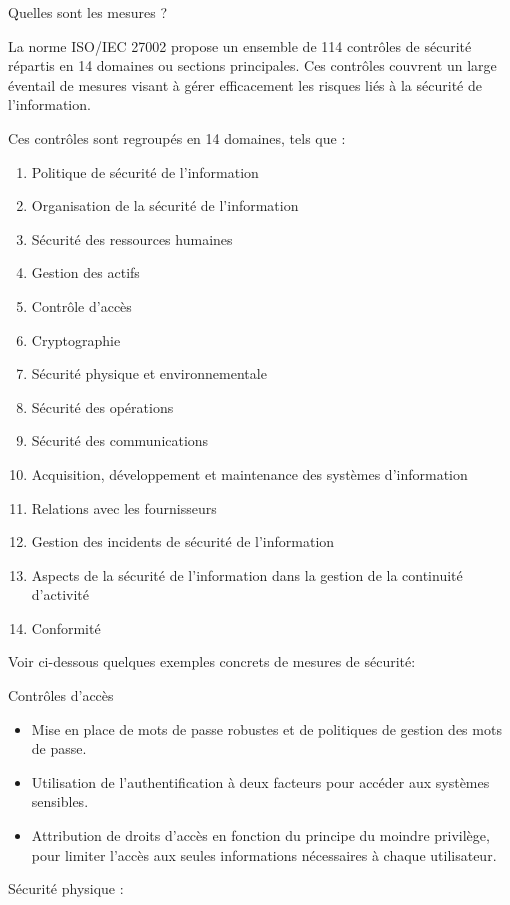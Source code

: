 Quelles sont les mesures ?

La norme ISO/IEC 27002 propose un ensemble de 114 contrôles de sécurité répartis en 14 domaines ou sections principales. Ces contrôles couvrent un large éventail de mesures visant à gérer efficacement les risques liés à la sécurité de l'information.

Ces contrôles sont regroupés en 14 domaines, tels que :

\begin{enumerate}
    \item Politique de sécurité de l'information
\item Organisation de la sécurité de l'information
\item Sécurité des ressources humaines
\item Gestion des actifs
\item Contrôle d’accès
\item Cryptographie
\item Sécurité physique et environnementale
\item Sécurité des opérations
\item Sécurité des communications
\item Acquisition, développement et maintenance des systèmes d’information
\item Relations avec les fournisseurs
\item Gestion des incidents de sécurité de l'information
\item Aspects de la sécurité de l'information dans la gestion de la continuité d’activité
\item Conformité
 \end{enumerate}

Voir ci-dessous quelques exemples concrets de mesures de sécurité:

Contrôles d’accès

\begin{itemize}
   \item Mise en place de mots de passe robustes et de politiques de gestion des mots de passe.
\item Utilisation de l’authentification à deux facteurs pour accéder aux systèmes sensibles.
\item Attribution de droits d’accès en fonction du principe du moindre privilège, pour limiter l’accès aux seules informations nécessaires à chaque utilisateur.
 \end{itemize}

Sécurité physique :

